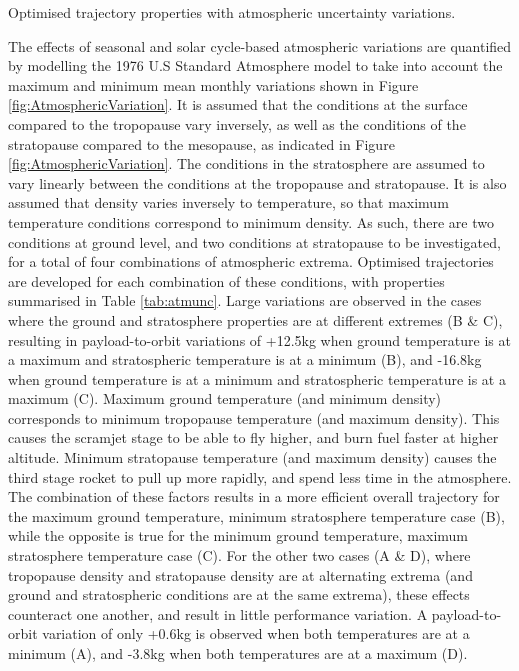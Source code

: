 \begin{table}[ht]
	\caption{Optimised trajectory properties with atmospheric uncertainty variations.}
		\label{tab:atmunc}
	
\end{table}



The effects of seasonal and solar cycle-based atmospheric variations are quantified by modelling the 1976 U.S Standard Atmosphere model to take into account the maximum and minimum mean monthly variations shown in Figure \ref{fig:AtmosphericVariation}. It is assumed that the conditions at the surface compared to the tropopause vary inversely, as well as the conditions of the stratopause compared to the mesopause, as indicated in Figure \ref{fig:AtmosphericVariation}. The conditions in the stratosphere are assumed to vary linearly between the conditions at the tropopause and stratopause. It is also assumed that density varies inversely to temperature, so that maximum temperature conditions correspond to minimum density. As such, there are two conditions at ground level, and two conditions at stratopause to be investigated, for a total of four combinations of atmospheric extrema. Optimised trajectories are developed for each combination of these conditions, with properties summarised in Table \ref{tab:atmunc}. Large variations are observed in the cases where the ground and stratosphere properties are at different extremes (B \& C), resulting in payload-to-orbit variations of +12.5kg when ground temperature is at a maximum and stratospheric temperature is at a minimum (B), and -16.8kg when ground temperature is at a minimum and stratospheric temperature is at a maximum (C). Maximum ground temperature (and minimum density) corresponds to minimum tropopause temperature (and maximum density). This causes the scramjet stage to be able to fly higher, and burn fuel faster at higher altitude. Minimum stratopause temperature (and maximum density) causes the third stage rocket to pull up more rapidly, and spend less time in the atmosphere. The combination of these factors results in a more efficient overall trajectory for the maximum ground temperature, minimum stratosphere temperature case (B), while the opposite is true for the minimum ground temperature, maximum stratosphere temperature case (C). For the other two cases (A \& D), where tropopause density and stratopause density are at alternating extrema (and ground and stratospheric conditions are at the same extrema), these effects counteract one another, and result in little performance variation. A payload-to-orbit variation of only +0.6kg is observed when both temperatures are at a minimum (A), and -3.8kg when both temperatures are at a maximum (D).

